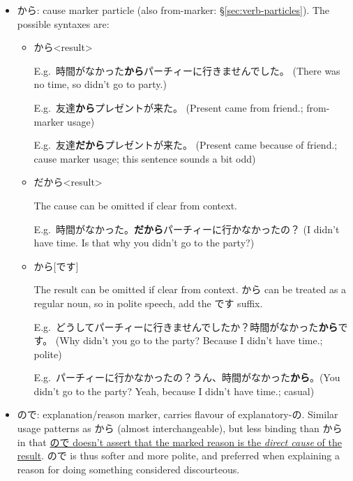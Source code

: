 \documentclass[../nihongo-gakushuu-kyouzai.tex]{subfiles}
\begin{document}
\begin{itemize}
    \item から: cause marker particle (also from-marker: \S\ref{sec:verb-particles}). The possible syntaxes are:
    \begin{itemize}
        \item <direct cause>[だ]から<result>


        E.g.\ 時間がなかった\textbf{から}パーチィーに行きませんでした。 (There was no time, so didn't go to party.)

        E.g.\ 友達\textbf{から}プレゼントが来た。 (Present came from friend.; from-marker usage)

        E.g.\ 友達\textbf{だから}プレゼントが来た。 (Present came because of friend.; cause marker usage; this sentence sounds a bit odd)

        \item{} だから<result>

        The cause can be omitted if clear from context. 

        E.g.\ 時間がなかった。\textbf{だから}パーチィーに行かなかったの？ (I didn't have time. Is that why you didn't go to the party?)
        \item <direct cause>[だ]から[です]

        The result can be omitted if clear from context. から can be treated as a regular noun, so in polite speech, add the です suffix.

        E.g.\ どうしてパーチィーに行きませんでしたか？時間がなかった\textbf{から}です。 (Why didn't you go to the party? Because I didn't have time.; polite)

        E.g.\ パーチィーに行かなかったの？うん、時間がなかった\textbf{から}。(You didn't go to the party? Yeah, because I didn't have time.; casual)
    \end{itemize}
    \item ので: explanation/reason marker, carries flavour of explanatory-の. Similar usage patterns as から (almost interchangeable), but less binding than から in that \ul{ので doesn't assert that the marked reason is the \emph{direct cause} of the result}. ので is thus softer and more polite, and preferred when explaining a reason for doing something considered discourteous.


\end{itemize}
\end{document}

